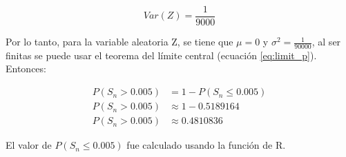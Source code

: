 \begin{equation*}
    Var(Z) = \frac{1}{9000}
\end{equation*}

Por lo tanto, para la variable aleatoria Z, se tiene que $\mu=0$ y $\sigma^2 = \frac{1}{90000}$, al ser finitas se puede usar el teorema del límite central (ecuación \ref{eq:limit_p}). Entonces:

\begin{align*}
    P(S_n>0.005) & = 1- P(S_n \leq 0.005) \\
    P(S_n>0.005) & \approx 1 - 0.5189164  \\
    P(S_n>0.005) & \approx 0.4810836
\end{align*}

El valor de $P(S_n \leq 0.005)$ fue calculado usando la función  de R.